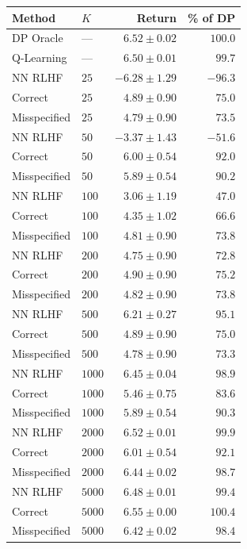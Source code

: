\begin{tabular}{llrr}
\hline
Method & $K$ & Return & \% of DP \\
\hline
DP Oracle & --- & $6.52 \pm 0.02$ & $100.0$ \\
Q-Learning & --- & $6.50 \pm 0.01$ & $99.7$ \\
\hline
NN RLHF & $25$ & $-6.28 \pm 1.29$ & $-96.3$ \\
Correct & $25$ & $4.89 \pm 0.90$ & $75.0$ \\
Misspecified & $25$ & $4.79 \pm 0.90$ & $73.5$ \\
\hline
NN RLHF & $50$ & $-3.37 \pm 1.43$ & $-51.6$ \\
Correct & $50$ & $6.00 \pm 0.54$ & $92.0$ \\
Misspecified & $50$ & $5.89 \pm 0.54$ & $90.2$ \\
\hline
NN RLHF & $100$ & $3.06 \pm 1.19$ & $47.0$ \\
Correct & $100$ & $4.35 \pm 1.02$ & $66.6$ \\
Misspecified & $100$ & $4.81 \pm 0.90$ & $73.8$ \\
\hline
NN RLHF & $200$ & $4.75 \pm 0.90$ & $72.8$ \\
Correct & $200$ & $4.90 \pm 0.90$ & $75.2$ \\
Misspecified & $200$ & $4.82 \pm 0.90$ & $73.8$ \\
\hline
NN RLHF & $500$ & $6.21 \pm 0.27$ & $95.1$ \\
Correct & $500$ & $4.89 \pm 0.90$ & $75.0$ \\
Misspecified & $500$ & $4.78 \pm 0.90$ & $73.3$ \\
\hline
NN RLHF & $1000$ & $6.45 \pm 0.04$ & $98.9$ \\
Correct & $1000$ & $5.46 \pm 0.75$ & $83.6$ \\
Misspecified & $1000$ & $5.89 \pm 0.54$ & $90.3$ \\
\hline
NN RLHF & $2000$ & $6.52 \pm 0.01$ & $99.9$ \\
Correct & $2000$ & $6.01 \pm 0.54$ & $92.1$ \\
Misspecified & $2000$ & $6.44 \pm 0.02$ & $98.7$ \\
\hline
NN RLHF & $5000$ & $6.48 \pm 0.01$ & $99.4$ \\
Correct & $5000$ & $6.55 \pm 0.00$ & $100.4$ \\
Misspecified & $5000$ & $6.42 \pm 0.02$ & $98.4$ \\
\hline
\end{tabular}
